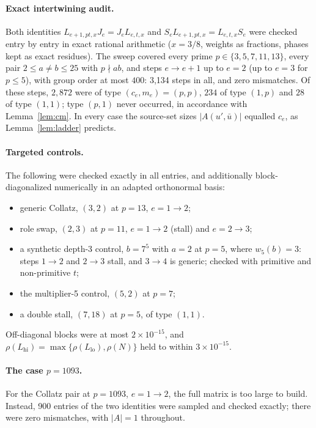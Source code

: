 \documentclass[11pt]{article}
\theoremstyle{definition}
\theoremstyle{remark}
\begin{document}
\paragraph{Exact intertwining audit.}
Both identities $L_{e+1,pt,x}J_e=J_eL_{e,t,x}$ and $S_eL_{e+1,pt,x}=L_{e,t,x}S_e$ were checked entry by entry in exact rational arithmetic ($x=3/8$, weights as fractions, phases kept as exact residues). The sweep covered every prime $p\in\{3,5,7,11,13\}$, every pair $2\le a\ne b\le25$ with $p\nmid ab$, and steps $e\to e+1$ up to $e=2$ (up to $e=3$ for $p\le5$), with group order at most $400$: 3{,}134 steps in all, and zero mismatches. Of these steps, $2{,}872$ were of type $(c_e,m_e)=(p,p)$, $234$ of type $(1,p)$ and $28$ of type $(1,1)$; type $(p,1)$ never occurred, in accordance with Lemma~\ref{lem:cm}. In every case the source-set sizes $|A(u',\bar u)|$ equalled $c_e$, as Lemma~\ref{lem:ladder} predicts.

\paragraph{Targeted controls.}
The following were checked exactly in all entries, and additionally block-diagonalized numerically in an adapted orthonormal basis:
\begin{itemize}
\item generic Collatz, $(3,2)$ at $p=13$, $e=1\to2$;
\item role swap, $(2,3)$ at $p=11$, $e=1\to2$ (stall) and $e=2\to3$;
\item a synthetic depth-3 control, $b=7^5$ with $a=2$ at $p=5$, where $w_5(b)=3$: steps $1\to2$ and $2\to3$ stall, and $3\to4$ is generic; checked with primitive and non-primitive $t$;
\item the multiplier-5 control, $(5,2)$ at $p=7$;
\item a double stall, $(7,18)$ at $p=5$, of type $(1,1)$.
\end{itemize}
Off-diagonal blocks were at most $2\times10^{-15}$, and $\rho(L_{\mathrm{hi}})=\max\{\rho(L_{\mathrm{lo}}),\rho(N)\}$ held to within $3\times10^{-15}$.

\paragraph{The case $p=1093$.}
For the Collatz pair at $p=1093$, $e=1\to2$, the full matrix is too large to build. Instead, 900 entries of the two identities were sampled and checked exactly; there were zero mismatches, with $|A|=1$ throughout.
\end{document}
